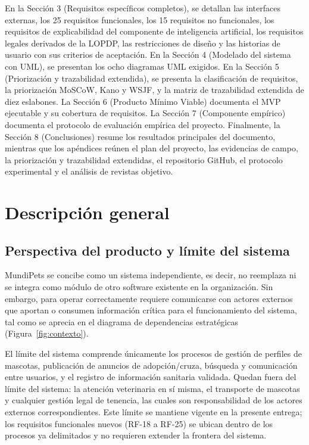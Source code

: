 \documentclass[journal,onecolumn]{IEEEtran}
\begin{document}
	En la Sección 3 (Requisitos específicos completos), se detallan las interfaces
	externas, los 25 requisitos funcionales, los 15 requisitos no funcionales, los
	requisitos de explicabilidad del componente de inteligencia artificial, los
	requisitos legales derivados de la LOPDP, las restricciones de diseño y las
	historias de usuario con sus criterios de aceptación. En la Sección 4
	(Modelado del sistema con UML), se presentan los ocho diagramas UML exigidos.
	En la Sección 5 (Priorización y trazabilidad extendida), se presenta la
	clasificación de requisitos, la priorización MoSCoW, Kano y WSJF, y la matriz
	de trazabilidad extendida de diez eslabones. La Sección 6 (Producto Mínimo
	Viable) documenta el MVP ejecutable y su cobertura de requisitos. La Sección 7
	(Componente empírico) documenta el protocolo de evaluación empírica del
	proyecto. Finalmente, la Sección 8 (Conclusiones) resume los resultados
	principales del documento, mientras que los apéndices reúnen el plan del
	proyecto, las evidencias de campo, la priorización y trazabilidad extendidas,
	el repositorio GitHub, el protocolo experimental y el análisis de revistas
	objetivo.
	
	\section{Descripción general}
	
	\subsection{Perspectiva del producto y límite del sistema}
	\label{sec:perspectiva}
	
	MundiPets se concibe como un sistema independiente, es decir, no reemplaza ni
	se integra como módulo de otro software existente en la organización. Sin
	embargo, para operar correctamente requiere comunicarse con actores externos
	que aportan o consumen información crítica para el funcionamiento del sistema,
	tal como se aprecia en el diagrama de dependencias estratégicas
	(Figura~\ref{fig:contexto}).
	
	El límite del sistema comprende únicamente los procesos de gestión de perfiles
	de mascotas, publicación de anuncios de adopción/cruza, búsqueda y
	comunicación entre usuarios, y el registro de información sanitaria validada.
	Quedan fuera del límite del sistema: la atención veterinaria en sí misma, el
	transporte de mascotas y cualquier gestión legal de tenencia, las cuales son
	responsabilidad de los actores externos correspondientes. Este límite se
	mantiene vigente en la presente entrega; los requisitos funcionales nuevos
	(RF-18 a RF-25) se ubican dentro de los procesos ya delimitados y no
	requieren extender la frontera del sistema.
	
\end{document}
